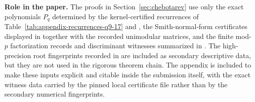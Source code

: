\medskip
\noindent\textbf{Role in the paper.}
The proofs in Section~\ref{sec:chebotarev} use only the exact polynomials
\(P_q\) determined by the kernel-certified recurrences of
Table~\ref{tab:appendix-recurrences-q9-17} and
, the Smith-normal-form certificates
displayed in
 together with the recorded
unimodular matrices, and the finite mod-\(p\) factorization records and
discriminant witnesses summarized in
.  The
high-precision root fingerprints recorded in
 are included as secondary descriptive data,
but they are not used in the rigorous theorem chain.
The appendix is included to make these inputs explicit and citable inside the
submission itself, with the exact witness data carried by the pinned local
certificate file rather than by the secondary numerical fingerprints.


